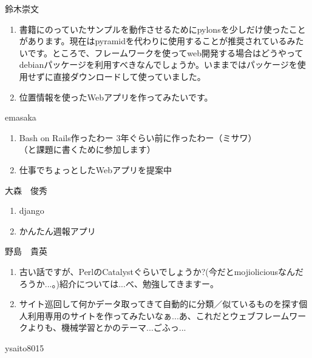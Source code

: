\begin{prework}{ 鈴木崇文 }
\begin{enumerate}
\item 書籍にのっていたサンプルを動作させるためにpylonsを少しだけ使ったことがあります。現在はpyramidを代わりに使用することが推奨されているみたいです。ところで、フレームワークを使ってweb開発する場合はどうやってdebianパッケージを利用すべきなんでしょうか。いままではパッケージを使用せずに直接ダウンロードして使っていました。
\item 位置情報を使ったWebアプリを作ってみたいです。
\end{enumerate}
\end{prework}

\begin{prework}{ emasaka }
\begin{enumerate}
\item Bash on Rails作ったわー 3年ぐらい前に作ったわー（ミサワ）\\
（と課題に書くために参加します）
\item 仕事でちょっとしたWebアプリを提案中
\end{enumerate}
\end{prework}

\begin{prework}{ 大森　俊秀 }
\begin{enumerate}
\item django
\item かんたん週報アプリ
\end{enumerate}
\end{prework}
\begin{prework}{ 野島　貴英 }
\begin{enumerate}
\item 古い話ですが、PerlのCatalystぐらいでしょうか?(今だとmojioliciousなんだろうか...。)紹介については...べ、勉強してきますー。
\item サイト巡回して何かデータ取ってきて自動的に分類／似ているものを探す個人利用専用のサイトを作ってみたいなぁ...あ、これだとウェブフレームワークよりも、機械学習とかのテーマ...ごふっ...
\end{enumerate}
\end{prework}

\begin{prework}{ ysaito8015 }


\end{prework}
